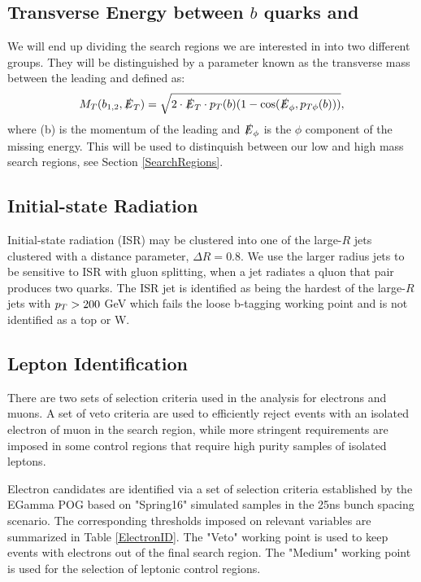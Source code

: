 \subsection{Transverse Energy between $b$ quarks and \met}
We will end up dividing the search regions we are interested in into two different groups. They will be distinguished by a parameter known as the transverse mass between the leading \bjet{} and \met{} defined as:
\begin{equation}\label{TransverseMass}
M_{T}(b_{1,2},\slashed{E}_{T})=\sqrt{2\cdot\slashed{E}_{T}\cdot p_{T}(b)(1-\cos(\slashed{E}_\phi,p_{T\phi}(b)))},
\end{equation}
where \pt(b) is the momentum of the leading \bjet{} and $\slashed{E}_\phi$ is the $\phi$ component of the missing energy. This will be used to distinquish between our low and high mass search regions, see Section \ref{SearchRegions}.


\subsection{Initial-state Radiation}\label{ISRpt}

Initial-state radiation (ISR) may be clustered into one of the large-$R$ jets clustered with a distance parameter, $\Delta R=0.8$. We use the larger radius jets to be sensitive to ISR with gluon splitting, when a jet radiates a qluon that pair produces two quarks. The ISR jet is identified as being the hardest of the large-$R$ jets with $p_{T}>200$ GeV which fails the loose b-tagging working point and is not identified as a top or W. 
 
 \subsection{Lepton Identification}\label{EleMuonID}
 There are two sets of selection criteria used in the analysis for electrons and muons. A set of veto criteria are used to efficiently reject events with an isolated electron of muon in the search region, while more stringent requirements are imposed in some control regions that require high purity samples of isolated leptons.
 
 Electron candidates are identified via a set of selection criteria established by the EGamma POG based on "Spring16" simulated samples in the 25ns bunch spacing scenario. The corresponding thresholds imposed on relevant variables are summarized in Table \ref{ElectronID}. The "Veto" working point is used to keep events with electrons out of the final search region. The "Medium" working point is used for the selection of leptonic control regions. 
 
